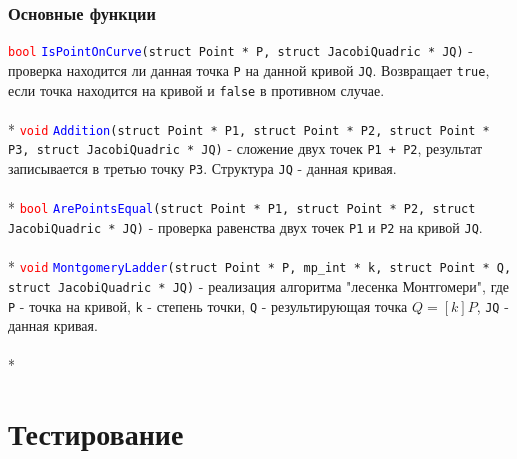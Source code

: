 \documentclass[12pt]{article}
\begin{document}
\subsubsection{Основные функции}
\textcolor{red}{\texttt{bool}} \textcolor{blue}{\texttt{IsPointOnCurve}}\texttt{(struct Point * P, struct JacobiQuadric * JQ)} - проверка находится ли данная точка \texttt{P} на данной кривой \texttt{JQ}. Возвращает \texttt{true}, если точка находится на кривой и \texttt{false} в противном случае.\\
\\*
\textcolor{red}{\texttt{void}} \textcolor{blue}{\texttt{Addition}}\texttt{(struct Point * P1, struct Point * P2, struct Point * P3, struct JacobiQuadric * JQ)} - сложение двух точек \texttt{P1 + P2}, результат записывается в третью точку \texttt{P3}. Структура \texttt{JQ} - данная кривая.\\
\\*
\textcolor{red}{\texttt{bool}} \textcolor{blue}{\texttt{ArePointsEqual}}\texttt{(struct Point * P1, struct Point * P2, struct JacobiQuadric * JQ)} - проверка равенства двух точек \texttt{P1} и \texttt{P2} на кривой \texttt{JQ}.\\
\\*
\textcolor{red}{\texttt{void}} \textcolor{blue}{\texttt{MontgomeryLadder}}\texttt{(struct Point * P, mp\_int * k, struct Point * Q, struct JacobiQuadric * JQ)} - реализация алгоритма "лесенка Монтгомери", где \texttt{P} - точка на кривой, \texttt{k} - степень точки, \texttt{Q} - результирующая точка $Q = [k]P$, \texttt{JQ} - данная кривая.\\
\\*


\section{Тестирование}
\end{document}
